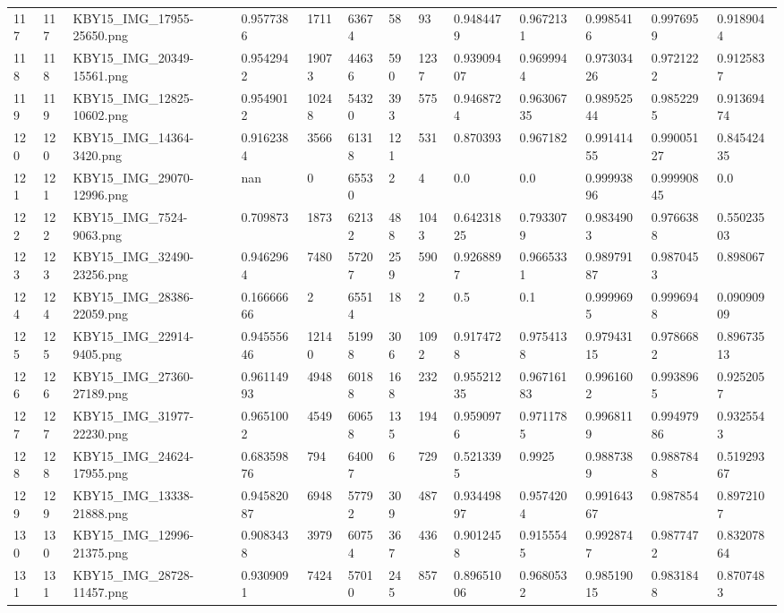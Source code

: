 \documentclass[11pt, a4paper, twoside]{report}
\begin{document}
\begin{longtable}[c]{@{}lllllllllllll@{}}
117 & 117 & KBY15\_IMG\_17955-25650.png & 0.9577386 & 1711 & 63674 & 58 & 93 & 0.9484479 & 0.9672131 & 0.9985416 & 0.9976959 & 0.9189044 \\
118 & 118 & KBY15\_IMG\_20349-15561.png & 0.9542942 & 19073 & 44636 & 590 & 1237 & 0.93909407 & 0.9699944 & 0.97303426 & 0.9721222 & 0.9125837 \\
119 & 119 & KBY15\_IMG\_12825-10602.png & 0.9549012 & 10248 & 54320 & 393 & 575 & 0.9468724 & 0.96306735 & 0.98952544 & 0.9852295 & 0.91369474 \\
120 & 120 & KBY15\_IMG\_14364-3420.png & 0.9162384 & 3566 & 61318 & 121 & 531 & 0.870393 & 0.967182 & 0.99141455 & 0.99005127 & 0.84542435 \\
121 & 121 & KBY15\_IMG\_29070-12996.png & nan & 0 & 65530 & 2 & 4 & 0.0 & 0.0 & 0.99993896 & 0.99990845 & 0.0 \\
122 & 122 & KBY15\_IMG\_7524-9063.png & 0.709873 & 1873 & 62132 & 488 & 1043 & 0.64231825 & 0.7933079 & 0.9834903 & 0.9766388 & 0.55023503 \\
123 & 123 & KBY15\_IMG\_32490-23256.png & 0.9462964 & 7480 & 57207 & 259 & 590 & 0.9268897 & 0.9665331 & 0.98979187 & 0.9870453 & 0.898067 \\
124 & 124 & KBY15\_IMG\_28386-22059.png & 0.16666666 & 2 & 65514 & 18 & 2 & 0.5 & 0.1 & 0.9999695 & 0.9996948 & 0.09090909 \\
125 & 125 & KBY15\_IMG\_22914-9405.png & 0.94555646 & 12140 & 51998 & 306 & 1092 & 0.9174728 & 0.9754138 & 0.97943115 & 0.9786682 & 0.89673513 \\
126 & 126 & KBY15\_IMG\_27360-27189.png & 0.96114993 & 4948 & 60188 & 168 & 232 & 0.95521235 & 0.96716183 & 0.9961602 & 0.9938965 & 0.9252057 \\
127 & 127 & KBY15\_IMG\_31977-22230.png & 0.9651002 & 4549 & 60658 & 135 & 194 & 0.9590976 & 0.9711785 & 0.9968119 & 0.99497986 & 0.9325543 \\
128 & 128 & KBY15\_IMG\_24624-17955.png & 0.68359876 & 794 & 64007 & 6 & 729 & 0.5213395 & 0.9925 & 0.9887389 & 0.9887848 & 0.51929367 \\
129 & 129 & KBY15\_IMG\_13338-21888.png & 0.94582087 & 6948 & 57792 & 309 & 487 & 0.93449897 & 0.9574204 & 0.99164367 & 0.987854 & 0.8972107 \\
130 & 130 & KBY15\_IMG\_12996-21375.png & 0.9083438 & 3979 & 60754 & 367 & 436 & 0.9012458 & 0.9155545 & 0.9928747 & 0.9877472 & 0.83207864 \\
131 & 131 & KBY15\_IMG\_28728-11457.png & 0.9309091 & 7424 & 57010 & 245 & 857 & 0.89651006 & 0.9680532 & 0.98519015 & 0.9831848 & 0.8707483 \\

\end{longtable}
\end{document}
